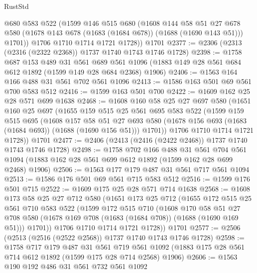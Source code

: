 \begin{lexlean}{RustStd}
\begin{coremodule}
        @680
        @583
        @522
        (@1599
          @146
          @515
          @680
          (@1608
            @144
            @58
            @51
            @27
            @678
            @580
            (@1678 @143 @678 (@1683 (@1684 @678)) (@1688 (@1690 @143 @51)))
            @1701))
        @1706
        @1710
        @1714
        @1721
        @1728))
    @1701
@2377 := @2306 (@2313 (@2316 (@2322 @2368)) @1737 @1740 @1743 @1746 @1728)
@2398 := @1758
    @687
    @153
    @489
    @31
    @561
    @689
    @561
    @1096
    (@1883 @149 @28 @561 @684 @612 @1892 (@1599 @149 @28 @684 @2368) @1906)
@2406 := @1563 @164 @166 @488 @31 @561 @702 @561 @1096
@2413 := @1586 @163 @501 @69 @561 @700 @583 @512
@2416 := @1599 @163 @501 @700
@2422 := @1609 @162 @25 @28 @571 @699 @1638
@2468 := @1608
    @160
    @58
    @25
    @27
    @697
    @580
    (@1651
      @160
      @25
      @697
      (@1655
        @159
        @515
        @25
        @561
        @695
        @583
        @522
        (@1599
          @159
          @515
          @695
          (@1608
            @157
            @58
            @51
            @27
            @693
            @580
            (@1678 @156 @693 (@1683 (@1684 @693)) (@1688 (@1690 @156 @51)))
            @1701))
        @1706
        @1710
        @1714
        @1721
        @1728))
    @1701
@2477 := @2406 (@2413 (@2416 (@2422 @2468)) @1737 @1740 @1743 @1746 @1728)
@2498 := @1758
    @702
    @166
    @488
    @31
    @561
    @704
    @561
    @1094
    (@1883 @162 @28 @561 @699 @612 @1892 (@1599 @162 @28 @699 @2468) @1906)
@2506 := @1563 @177 @179 @487 @31 @561 @717 @561 @1094
@2513 := @1586 @176 @501 @69 @561 @715 @583 @512
@2516 := @1599 @176 @501 @715
@2522 := @1609 @175 @25 @28 @571 @714 @1638
@2568 := @1608
    @173
    @58
    @25
    @27
    @712
    @580
    (@1651
      @173
      @25
      @712
      (@1655
        @172
        @515
        @25
        @561
        @710
        @583
        @522
        (@1599
          @172
          @515
          @710
          (@1608
            @170
            @58
            @51
            @27
            @708
            @580
            (@1678 @169 @708 (@1683 (@1684 @708)) (@1688 (@1690 @169 @51)))
            @1701))
        @1706
        @1710
        @1714
        @1721
        @1728))
    @1701
@2577 := @2506 (@2513 (@2516 (@2522 @2568)) @1737 @1740 @1743 @1746 @1728)
@2598 := @1758
    @717
    @179
    @487
    @31
    @561
    @719
    @561
    @1092
    (@1883 @175 @28 @561 @714 @612 @1892 (@1599 @175 @28 @714 @2568) @1906)
@2606 := @1563 @190 @192 @486 @31 @561 @732 @561 @1092

\end{coremodule}
\end{lexlean}
